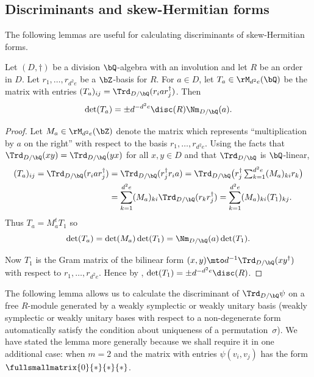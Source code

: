 \subsection{Discriminants and skew-Hermitian forms}

The following lemmas are useful for calculating discriminants of skew-Hermitian forms.

\begin{lemma} \label{disc-a-form}
Let $(D,\dag)$ be a division $\bQ$-algebra with an involution and let $R$ be an order in $D$.
Let $r_1, \dotsc, r_{d^2e}$ be a $\bZ$-basis for $R$.
For $a \in D$, let $T_a \in \rM_{d^2e}(\bQ)$ be the matrix with entries $(T_a)_{ij} = \Trd_{D/\bQ}(r_i a r_j^\dag)$.
Then\vspace*{-3pt}
\[
\det(T_a) = \pm d^{-d^2e} \disc(R) \Nm_{D/\bQ}(a).
\]
\end{lemma}

\begin{proof}
Let $M_a \in \rM_{d^2e}(\bZ)$ denote the matrix which represents ``multiplication by $a$ on the right'' with respect to the basis $r_1, \dotsc, r_{d^2e}$.
Using the facts that $\Trd_{D/\bQ}(xy) = \Trd_{D/\bQ}(yx)$ for all $x,y \in D$ and that $\Trd_{D/\bQ}$ is $\bQ$-linear,\vspace*{-3pt}
\begin{align*}
(T_a)_{ij}
= \Trd_{D/\bQ}(r_i a r_j^\dag)
& = \Trd_{D/\bQ}(r_j^\dag r_i a)
= \Trd_{D/\bQ} \bigl( r_j^\dag \textstyle\sum_{k=1}^{d^2e} (M_a)_{ki} r_k \bigr)
\\& = \sum_{k=1}^{d^2e}(M_a)_{ki} \Trd_{D/\bQ}(r_k r_j^\dag)
= \sum_{k=1}^{d^2e} (M_a)_{ki} (T_1)_{kj}.
\end{align*}
Thus $T_a = M_a^t T_1$ so\vspace*{-3pt}
\[
\det(T_a) = \det(M_a) \det(T_1) = \Nm_{D/\bQ}(a) \det(T_1).
\]

Now $T_1$ is the Gram matrix of the bilinear form $(x,y) \mto d^{-1}\Trd_{D/\bQ}(xy^\dag)$ with respect to $r_1, \dotsc, r_{d^2e}$.
Hence by \cite[Lem.\,5.6]{QRTUI}, $\det(T_1) = \pm d^{-d^2e} \disc(R)$.
\end{proof}

The following lemma allows us to calculate the discriminant of $\Trd_{D/\bQ} \psi$ on a free $R$-module generated by a weakly symplectic or weakly unitary basis (weakly symplectic or weakly unitary bases with respect to a non-degenerate form automatically satisfy the condition about uniqueness of a permutation~$\sigma$).
We have stated the lemma more generally because we shall require it in one additional case: when $m=2$ and the matrix with entries $\psi(v_i, v_j)$ has the form $\fullsmallmatrix{0}{*}{*}{*}$.

